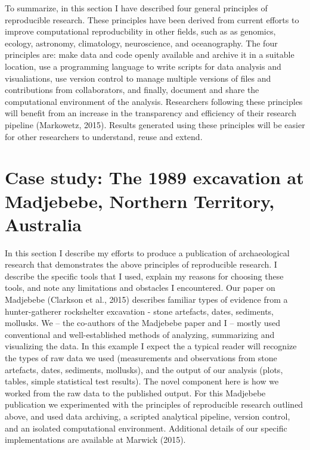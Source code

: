 \documentclass[american,man]{apa6}
\newcounter{author}
\begin{document}
To summarize, in this section I have described four general principles
of reproducible research. These principles have been derived from
current efforts to improve computational reproducbility in other fields,
such as as genomics, ecology, astronomy, climatology, neuroscience, and
oceanography. The four principles are: make data and code openly
available and archive it in a suitable location, use a programming
language to write scripts for data analysis and visualiations, use
version control to manage multiple versions of files and contributions
from collaborators, and finally, document and share the computational
environment of the analysis. Researchers following these principles will
benefit from an increase in the transparency and efficiency of their
research pipeline (Markowetz, 2015). Results generated using these
principles will be easier for other researchers to understand, reuse and
extend.

\section{Case study: The 1989 excavation at Madjebebe, Northern
Territory,
Australia}\label{case-study-the-1989-excavation-at-madjebebe-northern-territory-australia}

In this section I describe my efforts to produce a publication of
archaeological research that demonstrates the above principles of
reproducible research. I describe the specific tools that I used,
explain my reasons for choosing these tools, and note any limitations
and obstacles I encountered. Our paper on Madjebebe (Clarkson et al.,
2015) describes familiar types of evidence from a hunter-gatherer
rockshelter excavation - stone artefacts, dates, sediments, mollusks. We
-- the co-authors of the Madjebebe paper and I -- mostly used
conventional and well-established methods of analyzing, summarizing and
visualizing the data. In this example I expect the a typical reader will
recognize the types of raw data we used (measurements and observations
from stone artefacts, dates, sediments, mollusks), and the output of our
analysis (plots, tables, simple statistical test results). The novel
component here is how we worked from the raw data to the published
output. For this Madjebebe publication we experimented with the
principles of reproducible research outlined above, and used data
archiving, a scripted analytical pipeline, version control, and an
isolated computational environment. Additional details of our specific
implementations are available at Marwick (2015).
\end{document}
